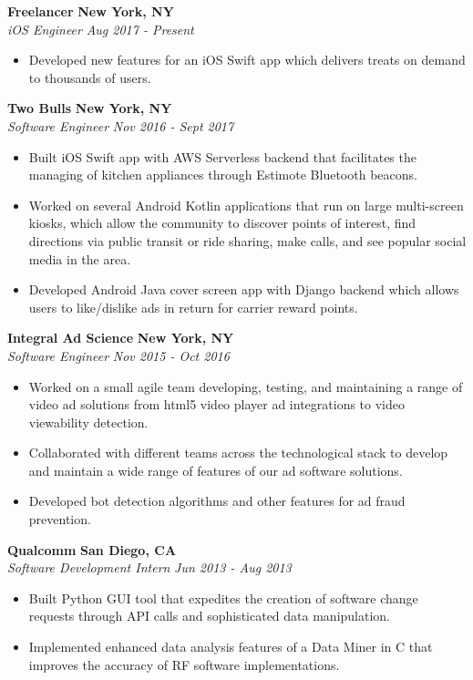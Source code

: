 \documentclass{res}
\begin{document}
\begin{resume}
{\bf Freelancer} \hfill {\bf New York, NY} \\
{\textit {iOS Engineer}} \hfill {\textit {Aug 2017 - Present}} 
\begin{itemize}
\renewcommand{\labelitemi}{\ding{117}}
\itemsep -2pt  
\item Developed new features for an iOS Swift app which delivers treats on demand to thousands of users.
\end{itemize}

{\bf Two Bulls} \hfill {\bf New York, NY} \\
{\textit {Software Engineer}} \hfill {\textit {Nov 2016 - Sept 2017}} 
\begin{itemize}
\renewcommand{\labelitemi}{\ding{117}}
\itemsep -2pt  
\item Built iOS Swift app with AWS Serverless backend that facilitates the managing of kitchen appliances through Estimote Bluetooth beacons. 
\item Worked on several Android Kotlin applications that run on large multi-screen kiosks, which allow the community to discover points of interest, find directions via public transit or ride sharing, make calls, and see popular social media in the area. 
\item Developed Android Java cover screen app with Django backend which allows users to like/dislike ads in return for carrier reward points.

\end{itemize}

{\bf Integral Ad Science} \hfill {\bf New York, NY} \\
{\textit {Software Engineer}} \hfill {\textit {Nov 2015 - Oct 2016}} 
\begin{itemize}
\renewcommand{\labelitemi}{\ding{117}}
\itemsep -2pt  
\item Worked on a small agile team developing, testing, and maintaining a range of video ad solutions from html5 video player ad integrations to video viewability detection.
\item Collaborated with different teams across the technological stack to develop and maintain a wide range of features of our ad software solutions.
\item Developed bot detection algorithms and other features for ad fraud prevention.

\end{itemize}

{\bf Qualcomm} \hfill {\bf San Diego, CA} \\
{\textit {Software Development Intern}} \hfill {\textit {Jun 2013 - Aug 2013}} 
\begin{itemize} 
\renewcommand{\labelitemi}{\ding{117}}
\itemsep -2pt  
\item Built Python GUI tool that expedites the creation of software 
	change requests through API calls and sophisticated data manipulation.
\item Implemented enhanced data analysis features of a Data Miner in C that
	 improves the accuracy of RF software implementations.
\end{itemize}


\end{resume}
\end{document}

